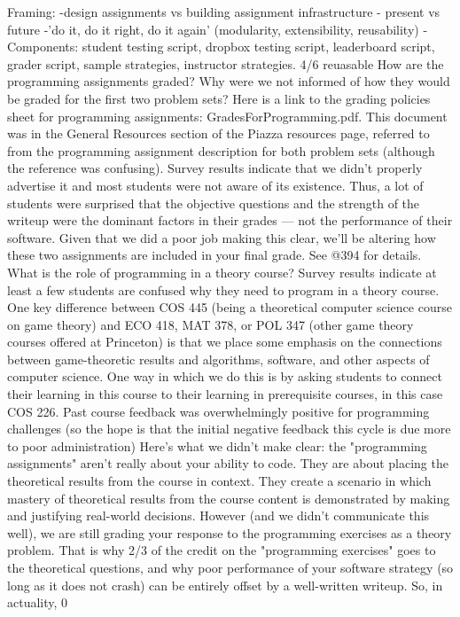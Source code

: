 \documentclass[pageno]{jpaper}
\begin{document}
Framing:
-design assignments vs building assignment infrastructure
- present vs future
-’do it, do it right, do it again’ (modularity, extensibility, reusability)
-Components: student testing script, dropbox testing script, leaderboard script, grader script, sample strategies, instructor strategies. 4/6 reuasable
How are the programming assignments graded? Why were we not informed of how they would be graded for the first two problem sets?
Here is a link to the grading policies sheet for programming assignments: GradesForProgramming.pdf. This document was in the General Resources section of the Piazza resources page, referred to from the programming assignment description for both problem sets (although the reference was confusing). Survey results indicate that we didn't properly advertise it and most students were not aware of its existence. Thus, a lot of students were surprised that the objective questions and the strength of the writeup were the dominant factors in their grades --- not the performance of their software. Given that we did a poor job making this clear, we'll be altering how these two assignments are included in your final grade. See @394 for details.
What is the role of programming in a theory course?
Survey results indicate at least a few students are confused why they need to program in a theory course. One key difference between COS 445 (being a theoretical computer science course on game theory) and ECO 418, MAT 378, or POL 347 (other game theory courses offered at Princeton) is that we place some emphasis on the connections between game-theoretic results and algorithms, software, and other aspects of computer science. One way in which we do this is by asking students to connect their learning in this course to their learning in prerequisite courses, in this case COS 226. Past course feedback was overwhelmingly positive for programming challenges (so the hope is that the initial negative feedback this cycle is due more to poor administration)
Here's what we didn't make clear: the "programming assignments" aren't really about your ability to code. They are about placing the theoretical results from the course in context. They create a scenario in which mastery of theoretical results from the course content is demonstrated by making and justifying real-world decisions. However (and we didn't communicate this well), we are still grading your response to the programming exercises as a theory problem. That is why 2/3 of the credit on the "programming exercises" goes to the theoretical questions, and why poor performance of your software strategy (so long as it does not crash) can be entirely offset by a well-written writeup. So, in actuality, 0%
\end{document}
